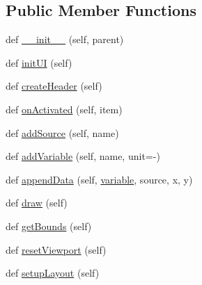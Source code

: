\subsection*{Public Member Functions}
\begin{DoxyCompactItemize}
\item 
def \mbox{\hyperlink{classwindshape_1_1gui_1_1widgets_1_1plots_1_1_plot_widget_1_1_plot_widget_a5598749959415954a3dd71a2fa42fb47}{\+\_\+\+\_\+init\+\_\+\+\_\+}} (self, parent)
\item 
def \mbox{\hyperlink{classwindshape_1_1gui_1_1widgets_1_1plots_1_1_plot_widget_1_1_plot_widget_a802c62de1cf00313fb8cac28b298ef89}{init\+UI}} (self)
\item 
def \mbox{\hyperlink{classwindshape_1_1gui_1_1widgets_1_1plots_1_1_plot_widget_1_1_plot_widget_aff7be7cb0167f5e4a6e5706afebeadba}{create\+Header}} (self)
\item 
def \mbox{\hyperlink{classwindshape_1_1gui_1_1widgets_1_1plots_1_1_plot_widget_1_1_plot_widget_a3e65ce3d2fcd5e51ee91a0ce953f6749}{on\+Activated}} (self, item)
\item 
def \mbox{\hyperlink{classwindshape_1_1gui_1_1widgets_1_1plots_1_1_plot_widget_1_1_plot_widget_a8ef8c06b7f55836076ed9c360812171d}{add\+Source}} (self, name)
\item 
def \mbox{\hyperlink{classwindshape_1_1gui_1_1widgets_1_1plots_1_1_plot_widget_1_1_plot_widget_a8516110c825f05cd3cc8f5c661953cb1}{add\+Variable}} (self, name, unit=\textquotesingle{}-\/\textquotesingle{})
\item 
def \mbox{\hyperlink{classwindshape_1_1gui_1_1widgets_1_1plots_1_1_plot_widget_1_1_plot_widget_a122553b70fe15d951e9314a7881be4d4}{append\+Data}} (self, \mbox{\hyperlink{classwindshape_1_1gui_1_1widgets_1_1plots_1_1_plot_widget_1_1_plot_widget_a740aa3698f6d10d8b3d352d69f890a7d}{variable}}, source, x, y)
\item 
def \mbox{\hyperlink{classwindshape_1_1gui_1_1widgets_1_1plots_1_1_plot_widget_1_1_plot_widget_adf6ec722eec97f5f3c670b7cc9e7b1c1}{draw}} (self)
\item 
def \mbox{\hyperlink{classwindshape_1_1gui_1_1widgets_1_1plots_1_1_plot_widget_1_1_plot_widget_a7afbd6a1cb3fde419ba5d829b2937122}{get\+Bounds}} (self)
\item 
def \mbox{\hyperlink{classwindshape_1_1gui_1_1widgets_1_1plots_1_1_plot_widget_1_1_plot_widget_afa4ffce30d37b17607e1f5acba0e357e}{reset\+Viewport}} (self)
\item 
def \mbox{\hyperlink{classwindshape_1_1gui_1_1widgets_1_1plots_1_1_plot_widget_1_1_plot_widget_a8b06aa1c5c5ed45d893a7b0674387759}{setup\+Layout}} (self)
\end{DoxyCompactItemize}
